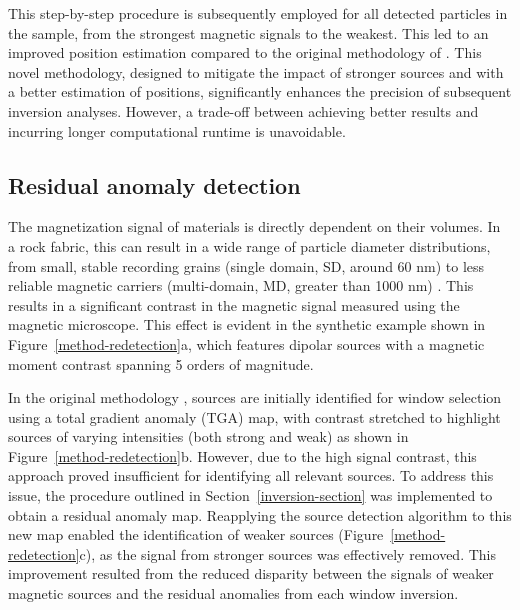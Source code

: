     This step-by-step procedure is subsequently employed for all detected particles in the sample, from the strongest magnetic signals to the weakest. This led to an improved position estimation compared to the original methodology of \citep{Souza-Junior2024}. This novel methodology, designed to mitigate the impact of stronger sources and with a better estimation of positions, significantly enhances the precision of subsequent inversion analyses. However, a trade-off between achieving better results and incurring longer computational runtime is unavoidable.

\subsection{Residual anomaly detection}

   The magnetization signal of materials is directly dependent on their volumes. In a rock fabric, this can result in a wide range of particle diameter distributions, from small, stable recording grains (single domain, SD, around 60 nm) to less reliable magnetic carriers (multi-domain, MD, greater than 1000 nm) \citep{Nagy2019}. This results in a significant contrast in the magnetic signal measured using the magnetic microscope. This effect is evident in the synthetic example shown in Figure~\ref{method-redetection}a, which features dipolar sources with a magnetic moment contrast spanning 5 orders of magnitude. 
   
    In the original methodology \citep{Souza-Junior2024}, sources are initially identified for window selection using a total gradient anomaly (TGA) map, with contrast stretched to highlight sources of varying intensities (both strong and weak) as shown in Figure~\ref{method-redetection}b. However, due to the high signal contrast, this approach proved insufficient for identifying all relevant sources. To address this issue, the procedure outlined in Section~\ref{inversion-section} was implemented to obtain a residual anomaly map. Reapplying the source detection algorithm to this new map enabled the identification of weaker sources (Figure~\ref{method-redetection}c), as the signal from stronger sources was effectively removed. This improvement resulted from the reduced disparity between the signals of weaker magnetic sources and the residual anomalies from each window inversion.

